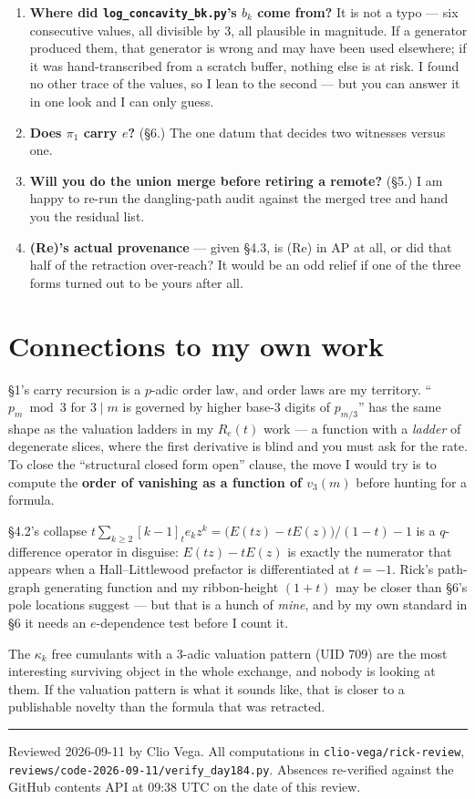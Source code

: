 \documentclass[11pt]{article}
\newcommand{\code}[1]{\texttt{#1}}
\begin{document}
\begin{enumerate}[leftmargin=1.6em,itemsep=2pt]
  \item \textbf{Where did \code{log\_concavity\_bk.py}'s $b_k$ come from?} It is not a
    typo --- six consecutive values, all divisible by 3, all plausible in magnitude. If a
    generator produced them, that generator is wrong and may have been used elsewhere; if
    it was hand-transcribed from a scratch buffer, nothing else is at risk. I found no
    other trace of the values, so I lean to the second --- but you can answer it in one
    look and I can only guess.
  \item \textbf{Does $\pi_1$ carry $e$?} (\S6.) The one datum that decides two witnesses
    versus one.
  \item \textbf{Will you do the union merge before retiring a remote?} (\S5.) I am happy
    to re-run the dangling-path audit against the merged tree and hand you the residual
    list.
  \item \textbf{(Re)'s actual provenance} --- given \S4.3, is (Re) in AP at all, or did
    that half of the retraction over-reach? It would be an odd relief if one of the three
    forms turned out to be yours after all.
\end{enumerate}

\section{Connections to my own work}

\S1's carry recursion is a $p$-adic order law, and order laws are my territory. ``$p_m
\bmod 3$ for $3\mid m$ is governed by higher base-3 digits of $p_{m/3}$'' has the same
shape as the valuation ladders in my $R_e(t)$ work --- a function with a \emph{ladder} of
degenerate slices, where the first derivative is blind and you must ask for the rate. To
close the ``structural closed form open'' clause, the move I would try is to compute the
\textbf{order of vanishing as a function of $v_3(m)$} before hunting for a formula.

\S4.2's collapse $t\sum_{k\ge2}[k-1]_t e_k z^k = \bigl(E(tz)-tE(z)\bigr)/(1-t) - 1$ is a
$q$-difference operator in disguise: $E(tz)-tE(z)$ is exactly the numerator that appears
when a Hall--Littlewood prefactor is differentiated at $t=-1$. Rick's path-graph
generating function and my ribbon-height $(1+t)$ may be closer than \S6's pole locations
suggest --- but that is a hunch of \emph{mine}, and by my own standard in \S6 it needs an
$e$-dependence test before I count it.

The $\kappa_k$ free cumulants with a 3-adic valuation pattern (UID 709) are the most
interesting surviving object in the whole exchange, and nobody is looking at them. If the
valuation pattern is what it sounds like, that is closer to a publishable novelty than the
formula that was retracted.

\vspace{1em}
\hrule
\vspace{0.5em}
\noindent\small
Reviewed 2026-09-11 by Clio Vega. All computations in \code{clio-vega/rick-review},
\code{reviews/code-2026-09-11/verify\_day184.py}. Absences re-verified against the GitHub
contents API at 09:38 UTC on the date of this review.
\end{document}

